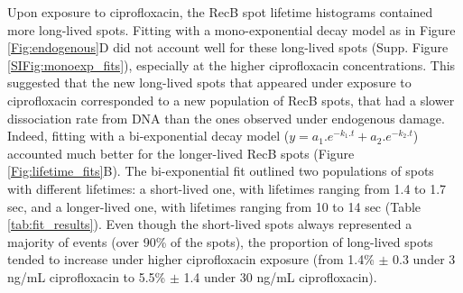 Upon exposure to ciprofloxacin, the RecB spot lifetime histograms contained more long-lived spots. Fitting with a mono-exponential decay model as in Figure \ref{Fig:endogenous}D did not account well for these long-lived spots (Supp. Figure \ref{SIFig:monoexp_fits}), especially at the higher ciprofloxacin concentrations. This suggested that the new long-lived spots that appeared under exposure to ciprofloxacin corresponded to a new population of RecB spots, that had a slower dissociation rate from DNA than the ones observed under endogenous damage. Indeed, fitting with a bi-exponential decay model ($y = a_1.e^{-k_1.t} + a_2.e^{-k_2.t}$) accounted much better for the longer-lived RecB spots (Figure \ref{Fig:lifetime_fits}B). The bi-exponential fit outlined two populations of spots with different lifetimes: a short-lived one, with lifetimes ranging from 1.4 to 1.7 sec, and a longer-lived one, with lifetimes ranging from 10 to 14 sec (Table \ref{tab:fit_results}). Even though the short-lived spots always represented a majority of events (over 90\% of the spots), the proportion of long-lived spots tended to increase under higher ciprofloxacin exposure (from 1.4\% $\pm$ 0.3 under 3 ng/mL ciprofloxacin to 5.5\% $\pm$ 1.4 under 30 ng/mL ciprofloxacin).

